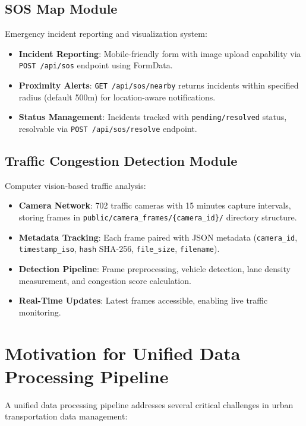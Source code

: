 \subsection{SOS Map Module}
Emergency incident reporting and visualization system:
\begin{itemize}
    \item \textbf{Incident Reporting}: Mobile-friendly form with image upload capability via \texttt{POST /api/sos} endpoint using FormData.
    \item \textbf{Proximity Alerts}: \texttt{GET /api/sos/nearby} returns incidents within specified radius (default 500m) for location-aware notifications.
    \item \textbf{Status Management}: Incidents tracked with \texttt{pending/resolved} status, resolvable via \texttt{POST /api/sos/resolve} endpoint.
\end{itemize}

\subsection{Traffic Congestion Detection Module}
Computer vision-based traffic analysis:
\begin{itemize}
    \item \textbf{Camera Network}: 702 traffic cameras with 15 minutes capture intervals, storing frames in \texttt{public/camera\_frames/\{camera\_id\}/} directory structure.
    \item \textbf{Metadata Tracking}: Each frame paired with JSON metadata (\texttt{camera\_id}, \texttt{timestamp\_iso}, \texttt{hash} SHA-256, \texttt{file\_size}, \texttt{filename}).
    \item \textbf{Detection Pipeline}: Frame preprocessing, vehicle detection, lane density measurement, and congestion score calculation.
    \item \textbf{Real-Time Updates}: Latest frames accessible, enabling live traffic monitoring.
\end{itemize}

\section{Motivation for Unified Data Processing Pipeline}

A unified data processing pipeline addresses several critical challenges in urban transportation data management:

